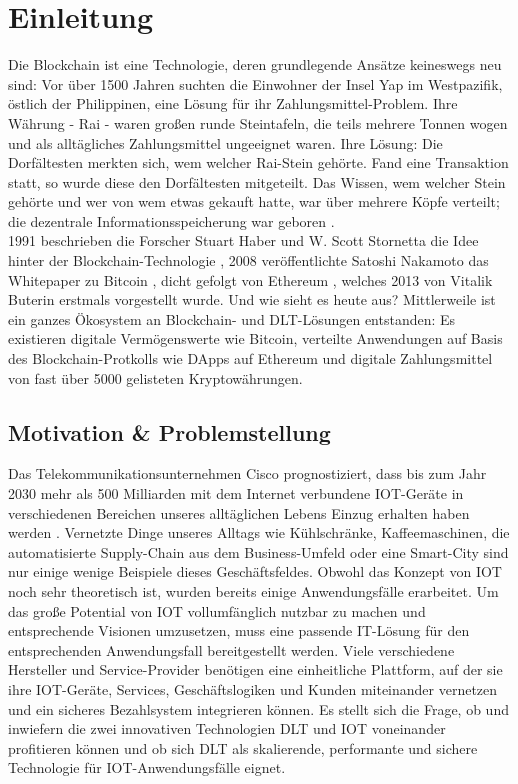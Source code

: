 \chapter{Einleitung}
\label{ch:intro}
Die Blockchain ist eine Technologie, deren grundlegende Ansätze keineswegs neu sind: Vor über 1500 Jahren suchten die Einwohner der Insel Yap im Westpazifik, östlich der Philippinen, eine Lösung für ihr Zahlungsmittel-Problem. Ihre Währung - Rai - waren großen runde Steintafeln, die teils mehrere Tonnen wogen und als alltägliches Zahlungsmittel ungeeignet waren. Ihre Lösung: Die Dorfältesten merkten sich, wem welcher Rai-Stein gehörte. Fand eine Transaktion statt, so wurde diese den Dorfältesten mitgeteilt. Das Wissen, wem welcher Stein gehörte und wer von wem etwas gekauft hatte, war über mehrere Köpfe verteilt; die dezentrale Informationsspeicherung war geboren \cite{forbes2018}.\\
1991 beschrieben die Forscher Stuart Haber und W. Scott Stornetta die Idee hinter der Blockchain-Technologie \cite{binance2019}, 2008 veröffentlichte Satoshi Nakamoto das Whitepaper zu Bitcoin \cite{nakamoto2009}, dicht gefolgt von Ethereum \cite{buterin2013}, welches 2013 von Vitalik Buterin erstmals vorgestellt wurde. Und wie sieht es heute aus? Mittlerweile ist ein ganzes Ökosystem an Block\-chain- und \ac{DLT}-Lösungen entstanden: Es existieren digitale Vermögenswerte wie Bitcoin, verteilte Anwendungen auf Basis des Blockchain-Protkolls wie \ac{DApp}s auf Ethereum und digitale Zahlungsmittel von fast über 5000 gelisteten Kryptowährungen.\\


%
%
\section{Motivation \& Problemstellung}
\label{sec:intro:motivation}
Das Telekommunikationsunternehmen Cisco prognostiziert, dass bis zum Jahr 2030 mehr als 500 Milliarden mit dem Internet verbundene \ac{IOT}-Geräte in verschiedenen Bereichen unseres alltäglichen Lebens Einzug erhalten haben werden \cite{cisco2016}. Vernetzte Dinge unseres Alltags wie Kühlschränke, Kaffeemaschinen, die automatisierte Supply-Chain aus dem Business-Umfeld oder eine Smart-City sind nur einige wenige Beispiele dieses Geschäftsfeldes. Obwohl das Konzept von \ac{IOT} noch sehr theoretisch ist, wurden bereits einige Anwendungsfälle erarbeitet. Um das große Potential von \ac{IOT} vollumfänglich nutzbar zu machen und entsprechende Visionen umzusetzen, muss eine passende IT-Lösung für den entsprechenden Anwendungsfall bereitgestellt werden. Viele verschiedene Hersteller und Service-Provider benötigen eine einheitliche Plattform, auf der sie ihre \ac{IOT}-Geräte, Services, Geschäftslogiken und Kunden miteinander vernetzen und ein sicheres Bezahlsystem integrieren können. Es stellt sich die Frage, ob und inwiefern die zwei innovativen Technologien \ac{DLT} und \ac{IOT} voneinander profitieren können und ob sich \ac{DLT} als skalierende, performante und sichere Technologie für \ac{IOT}-Anwendungsfälle eignet.

